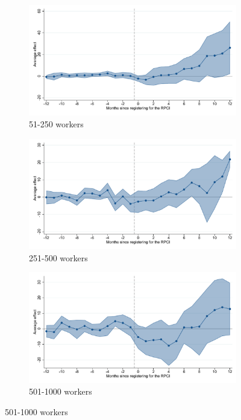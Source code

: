 \clearpage

\begin{figure}[H]
    \centering
    \ContinuedFloat
    \caption{(Cont.) Event studies - RPCI effect on formal wage}

    \begin{subfigure}{0.32\textwidth}
    \caption{51-250 workers}
    \includegraphics[width=\textwidth]{04_Figures/muestra_10porciento/event_study_sal_formal_size_51_dcdh_connected.pdf}
    \end{subfigure}
    \begin{subfigure}{0.32\textwidth}
    \caption{251-500 workers}
    \includegraphics[width=\textwidth]{04_Figures/muestra_10porciento/event_study_sal_formal_size_251_dcdh_connected.pdf}
    \end{subfigure}
    \begin{subfigure}{0.32\textwidth}
    \caption{501-1000 workers}
    \includegraphics[width=\textwidth]{04_Figures/muestra_10porciento/event_study_sal_formal_size_501_dcdh_connected.pdf}
    \end{subfigure}
    

\end{figure}
